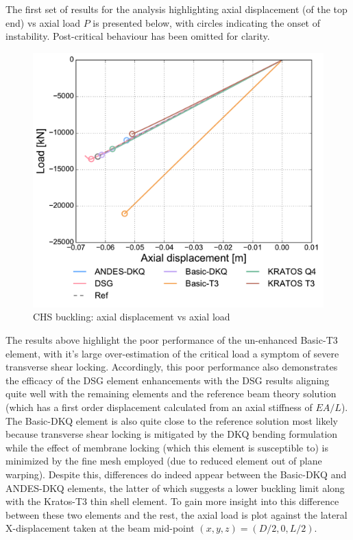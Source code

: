 The first set of results for the analysis highlighting axial displacement (of the top end) vs axial load $P$ is presented below, with circles indicating the onset of instability. Post-critical behaviour has been omitted for clarity.

\begin{figure}[H]
	\centering
	\def\svgwidth{\columnwidth}
	\includegraphics[width=12cm]{images/stability_chs_axial_disp.pdf}
	\caption{CHS buckling: axial displacement vs axial load}
	\label{pic:eulerchs1}
\end{figure}

The results above highlight the poor performance of the un-enhanced Basic-T3 element, with it's large over-estimation of the critical load a symptom of severe transverse shear locking. Accordingly, this poor performance also demonstrates the efficacy of the DSG element enhancements with the DSG results aligning quite well with the remaining elements and the reference beam theory solution (which has a first order displacement calculated from an axial stiffness of $EA/L$). The Basic-DKQ element is also quite close to the reference solution most likely because transverse shear locking is mitigated by the DKQ bending formulation while the effect of membrane locking (which this element is susceptible to) is minimized by the fine mesh employed (due to reduced element out of plane warping). Despite this, differences do indeed appear between the Basic-DKQ and ANDES-DKQ elements, the latter of which suggests a lower buckling limit along with the Kratos-T3 thin shell element. To gain more insight into this difference between these two elements and the rest, the axial load is plot against the lateral X-displacement taken at the beam mid-point $(x,y,z) = (D/2,0,L/2)$.

